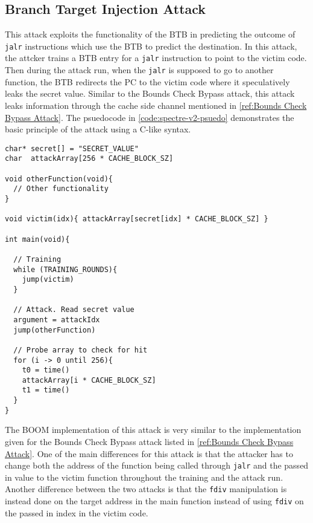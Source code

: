 \subsection{Branch Target Injection Attack}

This attack exploits the functionality of the BTB in predicting the outcome
of {\tt jalr} instructions which use the BTB to predict the destination. In this attack,
the attcker trains a BTB entry for a {\tt jalr} instruction to point to 
the victim code. Then during the attack run, when the {\tt jalr} is supposed to go to another function,
the BTB redirects the PC to the victim code where it speculatively leaks the secret value. Similar to the
Bounds Check Bypass attack, this attack leaks information through the
cache side channel mentioned in \ref{ref:Bounds Check Bypass Attack}. The psuedocode in 
\ref{code:spectre-v2-psuedo} demonstrates the basic principle of the attack using a C-like syntax.

\begin{lstlisting}[style=column-code, caption=Psuedocode of Bounds Check Bypass Attack]
char* secret[] = "SECRET_VALUE"
char  attackArray[256 * CACHE_BLOCK_SZ]

void otherFunction(void){
  // Other functionality    
}

void victim(idx){ attackArray[secret[idx] * CACHE_BLOCK_SZ] }

int main(void){
  
  // Training
  while (TRAINING_ROUNDS){
    jump(victim)
  }

  // Attack. Read secret value
  argument = attackIdx
  jump(otherFunction)

  // Probe array to check for hit
  for (i -> 0 until 256){
    t0 = time()
    attackArray[i * CACHE_BLOCK_SZ]
    t1 = time()
  }
}
\end{lstlisting}\label{code:spectre-v2-pseudo}

The BOOM implementation of this attack is very similar to the implementation given for
the Bounds Check Bypass attack listed in \ref{ref:Bounds Check Bypass Attack}. One of the main differences
for this attack is that the attacker has to change both the address of the function being called through
{\tt jalr} and the passed in value to the victim function throughout the training and the attack run.
Another difference between the two attacks is that the {\tt fdiv} manipulation is instead done on the target address
in the main function instead of using {\tt fdiv} on the passed in index in the victim code.
